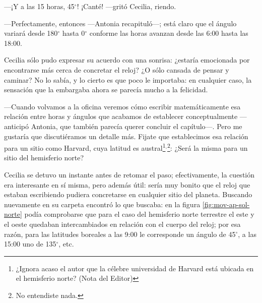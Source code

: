 ---¡Y a las 15 horas, 45$^{\circ}$! ¡Canté! ---gritó Cecilia, riendo.

---Perfectamente, entonces ---Antonia recapituló---; está claro que el
ángulo variará desde 180$^{\circ}$ hasta 0$^{\circ}$ conforme las
horas avanzan desde las 6:00 hasta las 18:00.
  
Cecilia sólo pudo expresar su acuerdo con una sonrisa: ¿estaría
emocionada por encontrarse más cerca de concretar el reloj?  ¿O sólo
cansada de pensar y caminar?  No lo sabía, y lo cierto es que poco le
importaba: en cualquier caso, la sensación que la embargaba ahora se
parecía mucho a la felicidad.

---Cuando volvamos a la oficina veremos cómo escribir matemáticamente
esa relación entre horas y ángulos que acabamos de establecer
conceptualmente ---anticipó Antonia, que también parecía querer
concluir el capítulo---. Pero me gustaría que discutiéramos un detalle
más. Fijate que establecimos esa relación para un sitio como Harvard,
cuya latitud es austral\footnote{¿Ignora acaso el autor que la célebre
  universidad de Harvard está ubicada en el hemisferio norte? (Nota
  del Editor)}$^,$\footnote{No entendiste nada.}: ¿Será la misma para
un sitio del hemisferio norte?

Cecilia se detuvo un instante antes de retomar el paso; efectivamente,
la cuestión era interesante en sí misma, pero además útil: sería muy
bonito que el reloj que estaban escribiendo pudiera concretarse en
cualquier sitio del planeta. Buscando nuevamente en su carpeta
encontró lo que buscaba: en la figura \ref{fig:mov-ap-sol-norte} podía
comprobarse que para el caso del hemisferio norte terrestre el este y
el oeste quedaban intercambiados en relación con el cuerpo del reloj;
por esa razón, para las latitudes boreales a las 9:00 le corresponde
un ángulo de 45$^{\circ}$, a las 15:00 uno de 135$^{\circ}$, etc.

